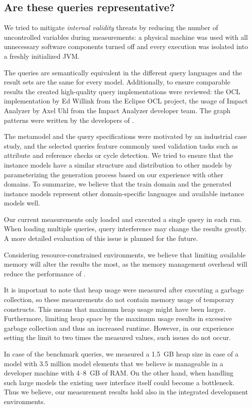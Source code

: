 \subsection{Are these queries representative?}


We tried to mitigate \emph{internal validity} threats by reducing the number of
uncontrolled variables during measurements: a physical machine was used with all
unnecessary software components turned off and every execution was isolated into
a freshly initialized JVM.

The queries are semantically equivalent in the different query languages and the
result sets are the same for every model. Additionally, to ensure comparable
results the created high-quality query implementations were reviewed: the OCL
implementation by Ed Willink from the Eclipse OCL project, the usage of Impact
Analyzer by Axel Uhl from the Impact Analyzer developer team. The graph patterns
were written by the developers of \incquery{}.

The metamodel and the query specifications were motivated by an industrial case
study, and the selected queries feature commonly used validation tasks such as
attribute and reference checks or cycle detection. We tried to ensure that the
instance models have a similar structure and distribution to other models by
parameterizing the generation process based on our experience with other
domains. To summarize, we believe that the train domain and the generated
instance models represent other domain-specific languages and available instance
models well.

Our current measurements only loaded and executed a single query in each run.
When loading multiple queries, query interference may change the results
greatly. A more detailed evaluation of this issue is planned for the future.

Considering resource-constrained environments, we believe that limiting
available memory will alter the results the most, as the memory management
overhead will reduce the performance of \incquery{}.

It is important to note that heap usage were measured after executing a garbage
collection, so these measurements do not contain memory usage of temporary
constructs. This means that maximum heap usage might have been larger. Furthermore,
limiting heap space by the maximum usage results in excessive garbage collection
and thus an increased runtime. However, in our experience setting the limit to
two times the measured values, such issues do not occur.

In case of the benchmark queries, we measured a 1.5~GB heap size in case of a
model with 3.5 million model elements that we believe is manageable in a developer
machine with 4--8~GB of RAM. On the other hand, when handling such large
models the existing user interface itself could become a bottleneck. Thus we
believe, our measurement results hold also in the integrated development
environments.
